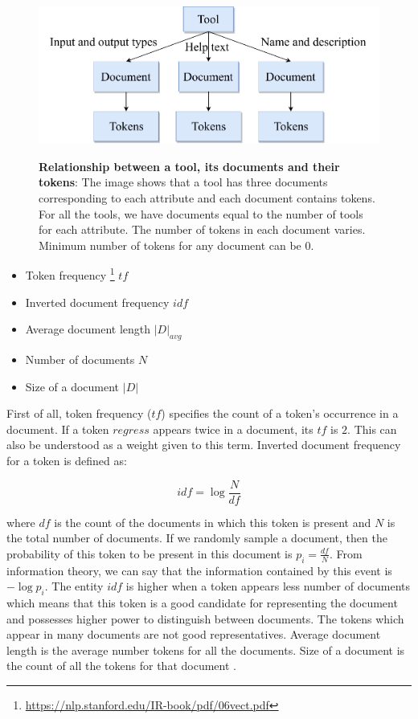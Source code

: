 \begin{figure}[h]
\begin{centering}
    {\includegraphics[scale=0.7]{figures/tool-document-tokens.pdf}}
    \caption[Tool, document and tokens]{\textbf{Relationship between a tool, its documents and their tokens}: The image shows that a tool has three documents corresponding to each attribute and each document contains tokens. For all the tools, we have documents equal to the number of tools for each attribute. The number of tokens in each document varies. Minimum number of tokens for any document can be 0.}
\end{centering}
\end{figure}
    
    \begin{itemize}
	\item Token frequency \footnote{\url{https://nlp.stanford.edu/IR-book/pdf/06vect.pdf}} $tf$
	\item Inverted document frequency $idf$
	\item Average document length $|D|_{avg}$
	\item Number of documents $N$
	\item Size of a document $|D|$
\end{itemize}
    
First of all, token frequency ($tf$) specifies the count of a token's occurrence in a document. If a token $regress$ appears twice in a document, its $tf$ is $2$. This can also be understood as a weight given to this term. Inverted document frequency for a token is defined as:

\begin{equation}
idf = \log \frac{N}{df}
\end{equation}
 
where $df$ is the count of the documents in which this token is present and $N$ is the total number of documents. If we randomly sample a document, then the probability of this token to be present in this document is $ p_i = \frac{df}{N} $. From information theory, we can say that the information contained by this event is $ - \log p_i $. The entity $idf$ is higher when a token appears less number of documents which means that this token is a good candidate for representing the document and possesses higher power to distinguish between documents. The tokens which appear in many documents are not good representatives. Average document length is the average number tokens for all the documents. Size of a document is the count of all the tokens for that document \cite{Robertson:2009:PRF:1704809.1704810}. 


